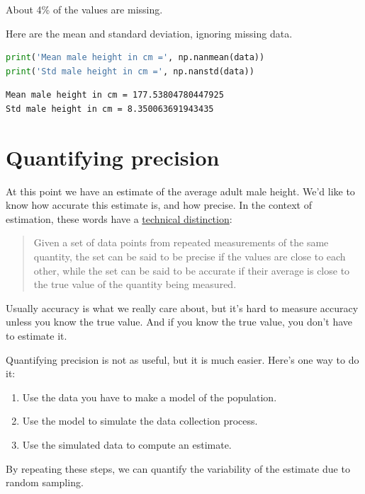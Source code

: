 About 4\% of the values are missing.

Here are the mean and standard deviation, ignoring missing data.

\begin{lstlisting}[language=Python]
print('Mean male height in cm =', np.nanmean(data))
print('Std male height in cm =', np.nanstd(data))
\end{lstlisting}

\begin{lstlisting}[]
Mean male height in cm = 177.53804780447925
Std male height in cm = 8.350063691943435
\end{lstlisting}

\hypertarget{quantifying-precision}{%
\section{Quantifying precision}\label{quantifying-precision}}

At this point we have an estimate of the average adult male height. We'd
like to know how accurate this estimate is, and how precise. In the
context of estimation, these words have a
\href{https://en.wikipedia.org/wiki/Accuracy_and_precision}{technical
distinction}:

\begin{quote}
Given a set of data points from repeated measurements of the same
quantity, the set can be said to be precise if the values are close to
each other, while the set can be said to be accurate if their average is
close to the true value of the quantity being measured.
\end{quote}

Usually accuracy is what we really care about, but it's hard to measure
accuracy unless you know the true value. And if you know the true value,
you don't have to estimate it.

Quantifying precision is not as useful, but it is much easier. Here's
one way to do it:

\begin{enumerate}
\def\labelenumi{\arabic{enumi}.}
\item
  Use the data you have to make a model of the population.
\item
  Use the model to simulate the data collection process.
\item
  Use the simulated data to compute an estimate.
\end{enumerate}

By repeating these steps, we can quantify the variability of the
estimate due to random sampling.

